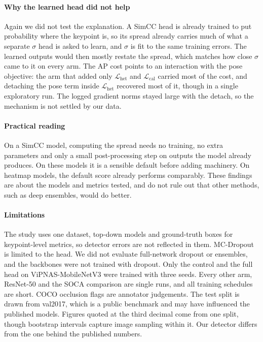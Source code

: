 \documentclass[preprint,11pt]{elsarticle}
\begin{document}
\paragraph{Why the learned head did not help} Again we did not test the explanation. A SimCC head is
already trained to put probability where the keypoint is, so its spread already carries much of what a
separate $\sigma$ head is asked to learn, and $\sigma$ is fit to the same training errors. The learned
outputs would then mostly restate the spread, which matches how close $\sigma$ came to it on every arm.
The AP cost points to an interaction with the pose objective: the arm that added only
$\mathcal{L}_{\text{het}}$ and $\mathcal{L}_{\text{cal}}$ carried most of the cost, and detaching the pose
term inside $\mathcal{L}_{\text{het}}$ recovered most of it, though in a single exploratory run. The
logged gradient norms stayed large with the detach, so the mechanism is not settled by our data.

\paragraph{Practical reading} On a SimCC model, computing the spread needs no training, no extra
parameters and only a small post-processing step on outputs the model already produces. On these
models it is a sensible default before adding machinery. On heatmap models, the default score already
performs comparably. These findings are about the models and metrics tested, and do not rule out that
other methods, such as deep ensembles, would do better.

\paragraph{Limitations} The study uses one dataset, top-down models and ground-truth boxes for
keypoint-level metrics, so detector errors are not reflected in them. MC-Dropout is limited to the head.
We did not evaluate full-network dropout or ensembles, and the backbones were not trained with
dropout. Only the control and the full head on ViPNAS-MobileNetV3 were trained with three seeds. Every
other arm, ResNet-50 and the SOCA comparison are single runs, and all training schedules are short.
COCO occlusion flags are annotator judgements. The test split is drawn from val2017, which
is a public benchmark and may have influenced the published models. Figures quoted at the third decimal
come from one split, though bootstrap intervals capture image sampling within it. Our detector differs
from the one behind the published numbers.
\end{document}
